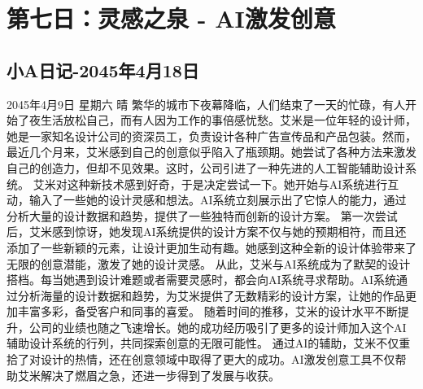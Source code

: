 \section{第七日：灵感之泉 - AI激发创意}
\subsection{小A日记-2045年4月18日}
2045年4月9日 星期六 晴
繁华的城市下夜幕降临，人们结束了一天的忙碌，有人开始了夜生活放松自己，而有人因为工作的事倍感忧愁。艾米是一位年轻的设计师，她是一家知名设计公司的资深员工，负责设计各种广告宣传品和产品包装。然而，最近几个月来，艾米感到自己的创意似乎陷入了瓶颈期。她尝试了各种方法来激发自己的创造力，但却不见效果。这时，公司引进了一种先进的人工智能辅助设计系统。
艾米对这种新技术感到好奇，于是决定尝试一下。她开始与AI系统进行互动，输入了一些她的设计灵感和想法。AI系统立刻展示出了它惊人的能力，通过分析大量的设计数据和趋势，提供了一些独特而创新的设计方案。
第一次尝试后，艾米感到惊讶，她发现AI系统提供的设计方案不仅与她的预期相符，而且还添加了一些新颖的元素，让设计更加生动有趣。她感到这种全新的设计体验带来了无限的创意潜能，激发了她的设计灵感。
从此，艾米与AI系统成为了默契的设计搭档。每当她遇到设计难题或者需要灵感时，都会向AI系统寻求帮助。AI系统通过分析海量的设计数据和趋势，为艾米提供了无数精彩的设计方案，让她的作品更加丰富多彩，备受客户和同事的喜爱。
随着时间的推移，艾米的设计水平不断提升，公司的业绩也随之飞速增长。她的成功经历吸引了更多的设计师加入这个AI辅助设计系统的行列，共同探索创意的无限可能性。
通过AI的辅助，艾米不仅重拾了对设计的热情，还在创意领域中取得了更大的成功。AI激发创意工具不仅帮助艾米解决了燃眉之急，还进一步得到了发展与收获。
